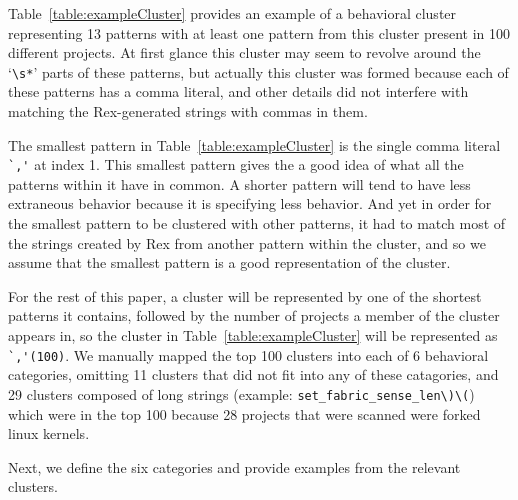 Table~\ref{table:exampleCluster} provides an example of a behavioral cluster representing 13 patterns with at least one pattern from this cluster present in 100 different projects.  At first glance this cluster may seem to revolve around the `\verb!\s*!' parts of these patterns, but actually this cluster was formed because each of these patterns has a comma literal, and other details did not interfere with matching the Rex-generated strings with commas in them.


The smallest pattern in Table~\ref{table:exampleCluster} is the single comma literal \verb!`,'! at index 1.  This smallest pattern gives the a good idea of what all the patterns within it have in common.  A shorter pattern will tend to have less extraneous behavior because it is specifying less behavior.  And yet in order for the smallest pattern to be clustered with other patterns, it had to match most of the strings created by Rex from another pattern within the cluster, and so we assume that {the smallest pattern is a good representation of the cluster}.

For the rest of this paper, a cluster will be represented by one of the shortest patterns it contains, followed by the number of projects a member of the cluster appears in, so the cluster in Table~\ref{table:exampleCluster} will be represented as \verb!`,'(100)!.
We  manually mapped the top 100 clusters into each of 6 behavioral categories, omitting 11 clusters that did not fit into any of these catagories, and 29 clusters composed of long strings (example: \verb!set_fabric_sense_len\)\(!) which were in the top 100 because 28 projects that were scanned were forked linux kernels.


Next, we define the six categories and provide examples from the relevant clusters.

